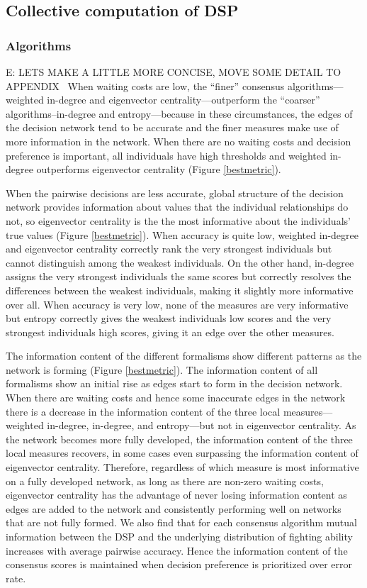 \documentclass{article}
\begin{document}
\subsection*{Collective computation of DSP }
\subsubsection*{Algorithms }
E: LETS MAKE A LITTLE MORE CONCISE, MOVE SOME DETAIL TO APPENDIX
\ When waiting costs are low, the ``finer'' consensus algorithms--- weighted in-degree and eigenvector centrality---outperform the ``coarser'' algorithms--in-degree and entropy---because in these circumstances, the edges of the decision network tend to be accurate and the finer measures make use of more information in the network. When there are no waiting costs and decision preference is important, all individuals have high thresholds and weighted in-degree outperforms eigenvector centrality (Figure \ref{bestmetric}).  

When the pairwise decisions are less accurate, global structure of the decision network provides information about values that the individual relationships do not, so eigenvector centrality is the the most informative about the individuals' true values (Figure \ref{bestmetric}).  When accuracy is quite low, weighted in-degree and eigenvector centrality correctly rank the very strongest individuals but cannot distinguish among the weakest individuals. On the other hand, in-degree assigns the very strongest individuals the same scores but correctly resolves the differences between the weakest individuals, making it slightly more informative over all. When accuracy is very low, none of the measures are very informative but entropy correctly gives the weakest individuals low scores and the very strongest individuals high scores, giving it an edge over the other measures.

The information content of the different formalisms show different patterns as the network is forming (Figure \ref{bestmetric}). The information content of all formalisms show an initial rise as edges start to form in the decision network. When there are waiting costs and hence some inaccurate edges in the network there is a decrease in the information content of the three local measures---weighted in-degree, in-degree, and entropy---but not in eigenvector centrality. As the network becomes more fully developed, the information content of the three local measures recovers, in some cases even surpassing the information content of eigenvector centrality. Therefore, regardless of which measure is most informative on a fully developed network, as long as there are non-zero waiting costs, eigenvector centrality has the advantage of never losing information content as edges are added to the network and consistently performing well on networks that are not fully formed. We also find that for each consensus algorithm mutual information between the DSP and the underlying distribution of fighting ability increases with average pairwise accuracy. Hence the information content of the consensus scores is maintained when decision preference is prioritized over error rate. 
\end{document}
